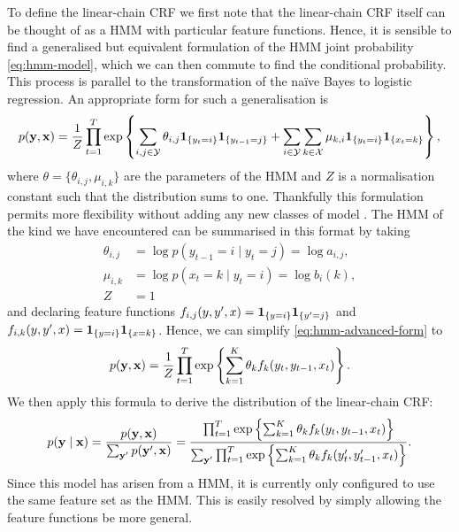 \documentclass[../main.tex]{subfiles}
\begin{document}
To define the linear-chain CRF we first note that the linear-chain CRF itself can be thought of as a HMM with particular feature functions.
Hence, it is sensible to find a generalised but equivalent formulation of the HMM joint probability \cref{eq:hmm-model}, which we can then commute to find the conditional probability.
This process is parallel to the transformation of the na{\"i}ve Bayes to logistic regression.
An appropriate form for such a generalisation is
\begin{equation} \label{eq:hmm-advanced-form}
    p(\mathbf{y},\mathbf{x}) = \frac{1}{Z} \prod_{t=1}^T \exp \left\{ \sum_{i,j \in \mathcal{Y}} \theta_{i,j} \mathbf{1}_{\{y_t=i\}}\mathbf{1}_{\{y_{t-1}=j\}} + \sum_{i \in \mathcal{Y}} \sum_{k \in \mathcal{X}} \mu_{k,i} \mathbf{1}_{\{y_t = i\}}\mathbf{1}_{\{x_t=k\}} \right\},
\end{equation}
where $\theta = \{\theta_{i,j},\mu_{i,k}\}$ are the parameters of the HMM and $Z$ is a normalisation constant such that the distribution sums to one.
Thankfully this formulation permits more flexibility without adding any new classes of model \autocite{sutton-2012-crfintro}.
The HMM of the kind we have encountered can be summarised in this format by taking
\begin{align*}
    \theta_{i,j} &= \log{p(y_{t-1}=i \mid y_t=j)} = \log{a_{i,j}}, \\
    \mu_{i,k} &= \log{p(x_t=k \mid y_t=i)} = \log{b_i(k)}, \\
    Z&=1
\end{align*}
and declaring feature functions $f_{i,j}(y,y',x) = \mathbf{1}_{\{y=i\}}\mathbf{1}_{\{y'=j\}}$ and $f_{i,k}(y,y',x)=\mathbf{1}_{\{y= i\}}\mathbf{1}_{\{x=k\}}$.
Hence, we can simplify \cref{eq:hmm-advanced-form} to
\begin{equation*}
    p(\mathbf{y},\mathbf{x}) = \frac{1}{Z} \prod_{t=1}^T \exp \left\{ \sum_{k=1}^K \theta_k f_k(y_t, y_{t-1}, x_t) \right\}.
\end{equation*}
We then apply this formula to derive the distribution of the linear-chain CRF:
\begin{equation*}
    p(\mathbf{y} \mid \mathbf{x}) = \frac{p(\mathbf{y},\mathbf{x})}{\sum_{\mathbf{y}'} p(\mathbf{y}',\mathbf{x})} = \frac{\prod_{t=1}^T \exp \left\{ \sum_{k=1}^K \theta_k f_k(y_t, y_{t-1}, x_t) \right\}}{\sum_{\mathbf{y}'} \prod_{t=1}^T  \exp \left\{ \sum_{k=1}^K \theta_k f_k(y'_t, y'_{t-1}, x_t) \right\}}.
\end{equation*}
Since this model has arisen from a HMM, it is currently only configured to use the same feature set as the HMM.
This is easily resolved by simply allowing the feature functions be more general.
\end{document}
